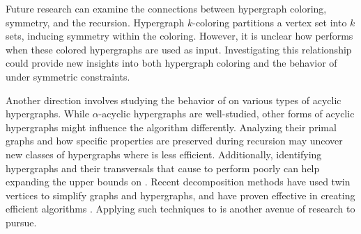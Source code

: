 Future research can examine the connections between hypergraph coloring, symmetry, and the \FKA{} recursion. Hypergraph $k$-coloring partitions a vertex set into $k$ sets, inducing symmetry within the coloring. However, it is unclear how \FKA{} performs when these colored hypergraphs are used as input. Investigating this relationship could provide new insights into both hypergraph coloring and the behavior of \FKA{} under symmetric constraints.

Another direction involves studying the behavior of \FKA{} on various types of acyclic hypergraphs. While $\alpha$-acyclic hypergraphs are well-studied, other forms of acyclic hypergraphs might influence the algorithm differently. Analyzing their primal graphs and how specific properties are preserved during recursion may uncover new classes of hypergraphs where \FKA{} is less efficient. Additionally, identifying hypergraphs and their transversals that cause \FKA{} to perform poorly can help expanding the upper bounds on \FKA. Recent decomposition methods have used twin vertices to simplify graphs and hypergraphs, and have proven effective in creating efficient algorithms \cite{RMN06}. Applying such techniques to \FKA{} is another avenue of research to pursue.
